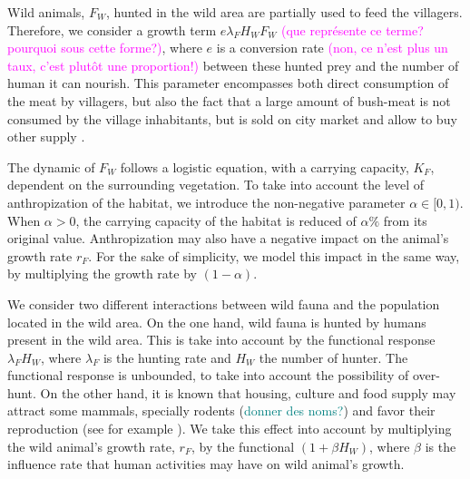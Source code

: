 \documentclass{article}
\newcommand{\lfw}{\lambda_{F}}
\newcommand{\lfw}{\lambda_{F}}
\newcommand{\marc}[1]{\textcolor{teal}{#1}}
\newcommand{\YD}[1]{\textcolor{magenta}{#1}}
\begin{document}
Wild animals, $F_W$, hunted in the wild area are partially used to feed the villagers. Therefore, we consider a growth term $e \lfw H_W F_W$ \YD{(que représente ce terme? pourquoi sous cette forme?)}, where $e$ is a conversion rate \YD{(non, ce n'est plus un taux, c'est plutôt une proportion!)} between these hunted prey and the number of human it can nourish. This parameter encompasses both direct consumption of the meat by villagers, but also the fact that a large amount of bush-meat is not consumed by the village inhabitants, but is sold on city market and allow to buy other supply \cite{wilkie_bushmeat_1998}.


The dynamic of $F_W$ follows a logistic equation, with a carrying capacity, $K_F$, dependent on the surrounding vegetation. To take into account the level of anthropization of the habitat, we introduce the non-negative parameter $\alpha \in [0, 1)$. When $\alpha > 0$, the carrying capacity of the habitat is reduced of $\alpha \%$ from its original value. Anthropization may also have a negative impact on the animal's growth rate $r_F$. For the sake of simplicity, we model this impact in the same way, by multiplying the growth rate by $(1-\alpha)$.

We consider two different interactions between wild fauna and the population located in the wild area. On the one hand, wild fauna is hunted by humans present in the wild area. This is take into account by the functional response $\lfw H_W$, where $\lfw$ is the hunting rate and $H_W$ the number of hunter. The functional response is unbounded, to take into account the possibility of over-hunt. On the other hand, it is known that housing, culture and food supply may attract some mammals, specially rodents (\marc{donner des noms?}) and favor their reproduction (see for example \cite{dounias_foraging_2011, dobigny_zoonotic_2022}). We take this effect into account by multiplying the wild animal's growth rate, $r_F$, by the functional $(1 +  \beta H_W)$, where $\beta$ is the influence rate that human activities may have on wild animal's growth.
\end{document}
